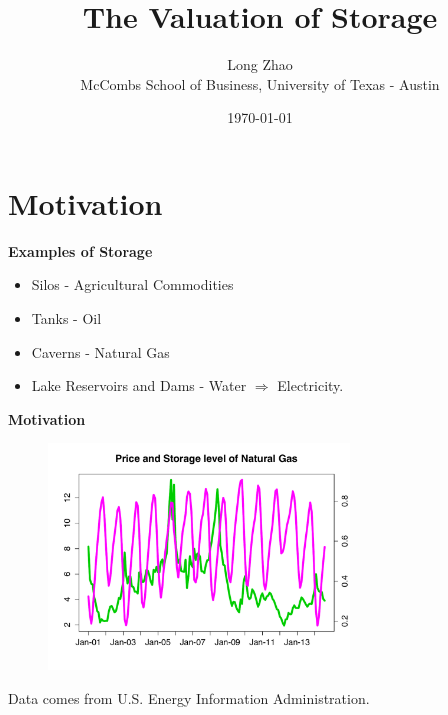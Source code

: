 \documentclass{beamer}
\title[Short title]{The Valuation of Storage} %
\author{Long Zhao\\ {\footnotesize McCombs School of Business, University of Texas - Austin}} %
\institute[UT Austin] %
{
 \small{Joint work with Kumar Muthuraman and Stathis Tompaidis}\\ %
\medskip
}
\date{\today} %
\begin{document}
\begin{frame}
\titlepage %
\end{frame}

\section{Motivation}

\begin{frame}
{\bf Examples of Storage}
\begin{itemize}
  \item Silos - Agricultural Commodities
  \item Tanks - Oil
  \item Caverns - Natural Gas 
  \item Lake Reservoirs and Dams - Water $\Rightarrow$ Electricity.          
  \end{itemize}
\end{frame}

\begin{frame}
{\bf Motivation}
\begin{figure}[hbt]
  \includegraphics[width = 8cm]{PriceStorageLevel.pdf}
\end{figure}
\begin{center}
Data comes from U.S. Energy Information Administration.
\end{center}
\end{frame}
\end{document}
